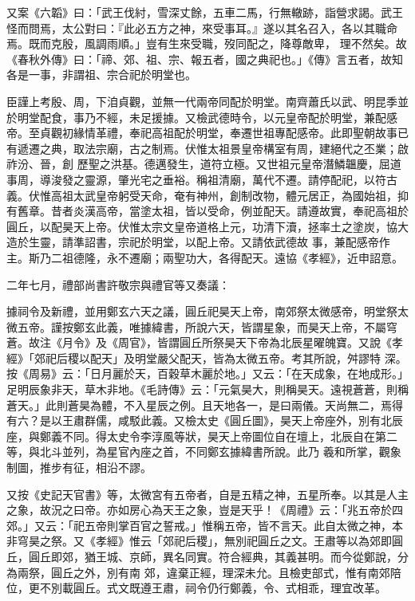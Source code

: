 \begin{pinyinscope}
 又案《六韜》曰：「武王伐紂，雪深丈餘，五車二馬，行無轍跡，詣營求謁。武王怪而問焉，太公對曰：『此必五方之神，來受事耳。』遂以其名召入，各以其職命焉。既而克殷，風調雨順。」豈有生來受職，歿同配之，降尊敵卑，
 理不然矣。故《春秋外傳》曰：「禘、郊、祖、宗、報五者，國之典祀也。」《傳》言五者，故知各是一事，非謂祖、宗合祀於明堂也。



 臣謹上考殷、周，下洎貞觀，並無一代兩帝同配於明堂。南齊蕭氏以武、明昆季並於明堂配食，事乃不經，未足援據。又檢武德時令，以元皇帝配於明堂，兼配感帝。至貞觀初緣情革禮，奉祀高祖配於明堂，奉遷世祖專配感帝。此即聖朝故事已有遞遷之典，取法宗廟，古之制焉。伏惟太祖景皇帝構室有周，建絕代之丕業；啟祚汾、晉，創
 歷聖之洪基。德邁發生，道符立極。又世祖元皇帝潛鱗韞慶，屈道事周，導浚發之靈源，肇光宅之垂裕。稱祖清廟，萬代不遷。請停配祀，以符古義。伏惟高祖太武皇帝躬受天命，奄有神州，創制改物，體元居正，為國始祖，抑有舊章。昔者炎漢高帝，當塗太祖，皆以受命，例並配天。請遵故實，奉祀高祖於圓丘，以配昊天上帝。伏惟太宗文皇帝道格上元，功清下瀆，拯率土之塗炭，協大造於生靈，請準詔書，宗祀於明堂，以配上帝。又請依武德故
 事，兼配感帝作主。斯乃二祖德隆，永不遷廟；兩聖功大，各得配天。遠協《孝經》，近申詔意。



 二年七月，禮部尚書許敬宗與禮官等又奏議：



 據祠令及新禮，並用鄭玄六天之議，圓丘祀昊天上帝，南郊祭太微感帝，明堂祭太微五帝。謹按鄭玄此義，唯據緯書，所說六天，皆謂星象，而昊天上帝，不屬穹蒼。故注《月令》及《周官》，皆謂圓丘所祭昊天下帝為北辰星曜魄寶。又說《孝經》「郊祀后稷以配天」及明堂嚴父配天，皆為太微五帝。考其所說，舛謬特
 深。按《周易》云：「日月麗於天，百穀草木麗於地。」又云：「在天成象，在地成形。」足明辰象非天，草木非地。《毛詩傳》云：「元氣昊大，則稱昊天。遠視蒼蒼，則稱蒼天。」此則蒼昊為體，不入星辰之例。且天地各一，是曰兩儀。天尚無二，焉得有六？是以王肅群儒，咸駁此義。又檢太史《圓丘圖》，昊天上帝座外，別有北辰座，與鄭義不同。得太史令李淳風等狀，昊天上帝圖位自在壇上，北辰自在第二等，與北斗並列，為星官內座之首，不同鄭玄據緯書所說。此乃
 羲和所掌，觀象制圖，推步有征，相沿不謬。



 又按《史記天官書》等，太微宮有五帝者，自是五精之神，五星所奉。以其是人主之象，故況之曰帝。亦如房心為天王之象，豈是天乎！《周禮》云：「兆五帝於四郊。」又云：「祀五帝則掌百官之誓戒。」惟稱五帝，皆不言天。此自太微之神，本非穹昊之祭。又《孝經》惟云「郊祀后稷」，無別祀圓丘之文。王肅等以為郊即圓丘，圓丘即郊，猶王城、京師，異名同實。符合經典，其義甚明。而今從鄭說，分為兩祭，圓丘之外，別有南
 郊，違棄正經，理深未允。且檢吏部式，惟有南郊陪位，更不別載圓丘。式文既遵王肅，祠令仍行鄭義，令、式相乖，理宜改革。




\end{pinyinscope}

